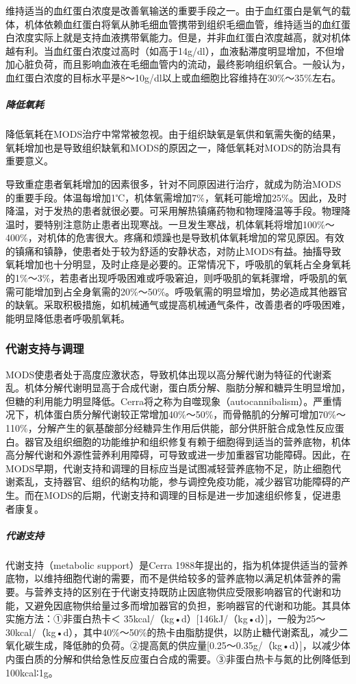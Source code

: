 维持适当的血红蛋白浓度是改善氧输送的重要手段之一。由于血红蛋白是氧气的载体，机体依赖血红蛋白将氧从肺毛细血管携带到组织毛细血管，维持适当的血红蛋白浓度实际上就是支持血液携带氧能力。但是，并非血红蛋白浓度越高，就对机体越有利。当血红蛋白浓度过高时（如高于14g/dl），血液黏滞度明显增加，不但增加心脏负荷，而且影响血液在毛细血管内的流动，最终影响组织氧合。一般认为，血红蛋白浓度的目标水平是8～10g/dl以上或血细胞比容维持在30\%～35\%左右。

\subparagraph{降低氧耗}

降低氧耗在MODS治疗中常常被忽视。由于组织缺氧是氧供和氧需失衡的结果，氧耗增加也是导致组织缺氧和MODS的原因之一，降低氧耗对MODS的防治具有重要意义。

导致重症患者氧耗增加的因素很多，针对不同原因进行治疗，就成为防治MODS的重要手段。体温每增加1℃，机体氧需增加7\%，氧耗可能增加25\%。因此，及时降温，对于发热的患者就很必要。可采用解热镇痛药物和物理降温等手段。物理降温时，要特别注意防止患者出现寒战。一旦发生寒战，机体氧耗将增加100\%～400\%，对机体的危害很大。疼痛和烦躁也是导致机体氧耗增加的常见原因。有效的镇痛和镇静，使患者处于较为舒适的安静状态，对防止MODS有益。抽搐导致氧耗增加也十分明显，及时止痉是必要的。正常情况下，呼吸肌的氧耗占全身氧耗的1\%～3\%，若患者出现呼吸困难或呼吸窘迫，则呼吸肌的氧耗骤增，呼吸肌的氧需可能增加到占全身氧需的20\%～50\%。呼吸氧需的明显增加，势必造成其他器官的缺氧。采取积极措施，如机械通气或提高机械通气条件，改善患者的呼吸困难，能明显降低患者呼吸肌氧耗。

\subsubsection{代谢支持与调理}

MODS使患者处于高度应激状态，导致机体出现以高分解代谢为特征的代谢紊乱。机体分解代谢明显高于合成代谢，蛋白质分解、脂肪分解和糖异生明显增加，但糖的利用能力明显降低。Cerra将之称为自噬现象（autocannibalism）。严重情况下，机体蛋白质分解代谢较正常增加40\%～50\%，而骨骼肌的分解可增加70\%～110\%，分解产生的氨基酸部分经糖异生作用后供能，部分供肝脏合成急性反应蛋白。器官及组织细胞的功能维护和组织修复有赖于细胞得到适当的营养底物，机体高分解代谢和外源性营养利用障碍，可导致或进一步加重器官功能障碍。因此，在MODS早期，代谢支持和调理的目标应当是试图减轻营养底物不足，防止细胞代谢紊乱，支持器官、组织的结构功能，参与调控免疫功能，减少器官功能障碍的产生。而在MODS的后期，代谢支持和调理的目标是进一步加速组织修复，促进患者康复。

\subparagraph{代谢支持}

代谢支持（metabolic support）是Cerra
1988年提出的，指为机体提供适当的营养底物，以维持细胞代谢的需要，而不是供给较多的营养底物以满足机体营养的需要。与营养支持的区别在于代谢支持既防止因底物供应受限影响器官的代谢和功能，又避免因底物供给量过多而增加器官的负担，影响器官的代谢和功能。其具体实施方法：①非蛋白热卡＜
35kcal/（kg•d）{[}146kJ/（kg•d）{]}，一般为25～30kcal/（kg•d），其中40\%～50\%的热卡由脂肪提供，以防止糖代谢紊乱，减少二氧化碳生成，降低肺的负荷。②提高氮的供应量{[}0.25～0.35g/（kg•d）{]}，以减少体内蛋白质的分解和供给急性反应蛋白合成的需要。③非蛋白热卡与氮的比例降低到100kcal∶1g。

